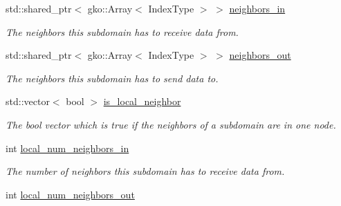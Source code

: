 \begin{DoxyCompactItemize}
\mbox{\label{structschwz_1_1Communicate_1_1comm__struct_a0dcb204149fb4f730e62255a84bc156a}} 
std\+::shared\+\_\+ptr$<$ gko\+::\+Array$<$ Index\+Type $>$ $>$ \hyperlink{structschwz_1_1Communicate_1_1comm__struct_a0dcb204149fb4f730e62255a84bc156a}{neighbors\+\_\+in}
\begin{DoxyCompactList}\small\item\em The neighbors this subdomain has to receive data from. \end{DoxyCompactList}\item 
\mbox{\label{structschwz_1_1Communicate_1_1comm__struct_a6ae39215a67e0a19131d0249e9fd2083}} 
std\+::shared\+\_\+ptr$<$ gko\+::\+Array$<$ Index\+Type $>$ $>$ \hyperlink{structschwz_1_1Communicate_1_1comm__struct_a6ae39215a67e0a19131d0249e9fd2083}{neighbors\+\_\+out}
\begin{DoxyCompactList}\small\item\em The neighbors this subdomain has to send data to. \end{DoxyCompactList}\item 
std\+::vector$<$ bool $>$ \hyperlink{structschwz_1_1Communicate_1_1comm__struct_ae36319cfa4fc09154135a2b121377d3b}{is\+\_\+local\+\_\+neighbor}
\begin{DoxyCompactList}\small\item\em The bool vector which is true if the neighbors of a subdomain are in one node. \end{DoxyCompactList}\item 
\mbox{\label{structschwz_1_1Communicate_1_1comm__struct_a9d4febd22c050bd5bbeb0f122d74fdd0}} 
int \hyperlink{structschwz_1_1Communicate_1_1comm__struct_a9d4febd22c050bd5bbeb0f122d74fdd0}{local\+\_\+num\+\_\+neighbors\+\_\+in}
\begin{DoxyCompactList}\small\item\em The number of neighbors this subdomain has to receive data from. \end{DoxyCompactList}\item 
\mbox{\label{structschwz_1_1Communicate_1_1comm__struct_a8b211e456ef9f0947df8fad0e0428990}} 
int \hyperlink{structschwz_1_1Communicate_1_1comm__struct_a8b211e456ef9f0947df8fad0e0428990}{local\+\_\+num\+\_\+neighbors\+\_\+out}

\end{DoxyCompactItemize}
